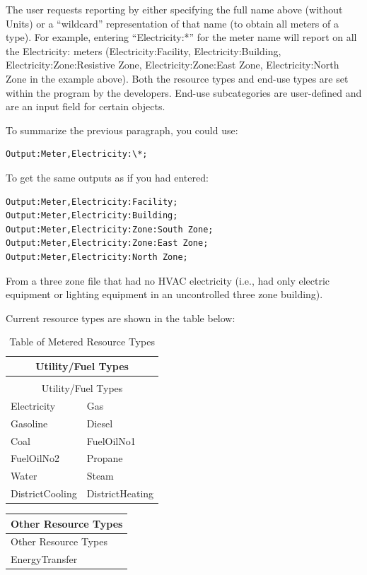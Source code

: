The user requests reporting by either specifying the full name above (without Units) or a “wildcard” representation of that name (to obtain all meters of a type). For example, entering “Electricity:*” for the meter name will report on all the Electricity: meters (Electricity:Facility, Electricity:Building, Electricity:Zone:Resistive Zone, Electricity:Zone:East Zone, Electricity:North Zone in the example above). Both the resource types and end-use types are set within the program by the developers. End-use subcategories are user-defined and are an input field for certain objects.

To summarize the previous paragraph, you could use:

\begin{lstlisting}
Output:Meter,Electricity:\*;
\end{lstlisting}

To get the same outputs as if you had entered:

\begin{lstlisting}
Output:Meter,Electricity:Facility;
Output:Meter,Electricity:Building;
Output:Meter,Electricity:Zone:South Zone;
Output:Meter,Electricity:Zone:East Zone;
Output:Meter,Electricity:North Zone;
\end{lstlisting}

From a three zone file that had no HVAC electricity (i.e., had only electric equipment or lighting equipment in an uncontrolled three zone building).

Current resource types are shown in the table below:

\begin{longtable}[c]{@{}ll@{}}
\caption{Table of Metered Resource Types \label{table:table-of-metered-resource-types}} \tabularnewline
\toprule
\multicolumn{2}{c}{Utility/Fuel Types} \tabularnewline
\midrule
\endfirsthead

\caption[]{Table of Metered Resource Types} \tabularnewline
\toprule
\multicolumn{2}{c}{Utility/Fuel Types} \tabularnewline
\midrule
\endhead

Electricity & Gas \tabularnewline
Gasoline & Diesel \tabularnewline
Coal & FuelOilNo1 \tabularnewline
FuelOilNo2 & Propane \tabularnewline
Water & Steam \tabularnewline
DistrictCooling & DistrictHeating \tabularnewline
\bottomrule
\end{longtable}

\begin{longtable}[c]{@{}l@{}}
\toprule
Other Resource Types \tabularnewline
\midrule
\endfirsthead

\toprule
Other Resource Types \tabularnewline
\midrule
\endhead

EnergyTransfer \tabularnewline
\bottomrule
\end{longtable}

